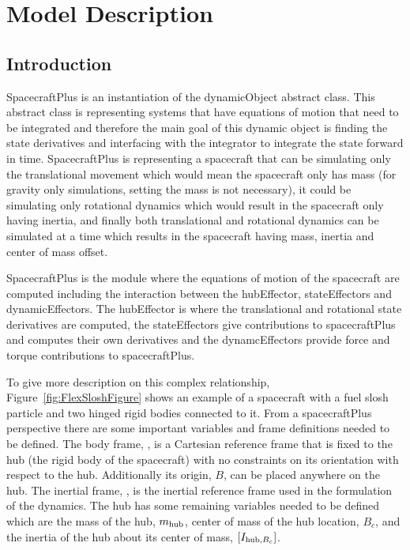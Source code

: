 

\section{Model Description}

\subsection{Introduction}

SpacecraftPlus is an instantiation of the dynamicObject abstract class. This abstract class is representing systems that have equations of motion that need to be integrated and therefore the main goal of this dynamic object is finding the state derivatives and interfacing with the integrator to integrate the state forward in time. SpacecraftPlus is representing a spacecraft that can be simulating only the translational movement which would mean the spacecraft only has mass (for gravity only simulations, setting the mass is not necessary), it could be simulating only rotational dynamics which would result in the spacecraft only having inertia, and finally both translational and rotational dynamics can be simulated at a time which results in the spacecraft having mass, inertia and center of mass offset.

SpacecraftPlus is the module where the equations of motion of the spacecraft are computed including the interaction between the hubEffector, stateEffectors and dynamicEffectors. The hubEffector is where the translational and rotational state derivatives are computed, the stateEffectors give contributions to spacecraftPlus and computes their own derivatives and the dynamcEffectors provide force and torque contributions to spacecraftPlus.

To give more description on this complex relationship, Figure~\ref{fig:FlexSloshFigure} shows an example of a spacecraft with a fuel slosh particle and two hinged rigid bodies connected to it. From a spacecraftPlus perspective there are some important variables and frame definitions needed to be defined. The body frame, , is a Cartesian reference frame that is fixed to the hub (the rigid body of the spacecraft) with no constraints on its orientation with respect to the hub. Additionally its origin, $B$, can be placed anywhere on the hub. The inertial frame, , is the inertial reference frame used in the formulation of the dynamics. The hub has some remaining variables needed to be defined which are the mass of the hub, $m_{\textnormal{hub}}$, center of mass of the hub location, $B_c$, and the inertia of the hub about its center of mass, $[I_{\textnormal{hub},B_c}]$. 

